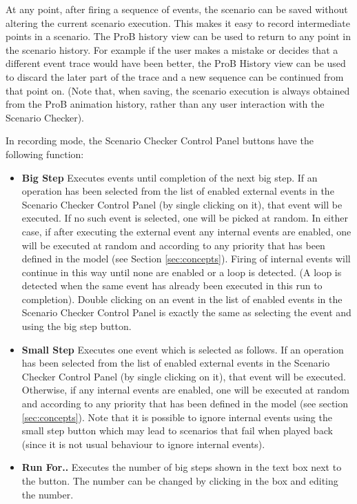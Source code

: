 At any point, after firing a sequence of events, the scenario can be saved without altering the current scenario execution. 
This makes it easy to record intermediate points in a scenario.
The ProB history view can be used to return to any point in the scenario history.
For example if the user makes a mistake or decides that a different event trace would have been better, the ProB History view can be used to discard the later part of the trace and a new sequence can be continued from that point on.
(Note that, when saving, the scenario execution is always obtained from the ProB animation history, rather than any user interaction with the Scenario Checker).

In recording mode, the Scenario Checker Control Panel buttons have the following function:
\begin{itemize}
	\item \textbf{Big Step}  Executes events until completion of the next big step. If an operation has been selected from the list of enabled external events in the Scenario Checker Control Panel (by single clicking on it), that event will be executed. If no such event is selected, one will be picked at random. In either case, if after executing the external event any internal events are enabled, one will be executed at random and according to any priority that has been defined in the model (see Section \ref{sec:concepts}). Firing of internal events will continue in this way until none are enabled or a loop is detected. (A loop is detected when the same event has already been executed in this run to completion). Double clicking on an event in the list of enabled events in the Scenario Checker Control Panel is exactly the same as selecting the event and using the big step button.
	\item \textbf{Small Step}  Executes one event which is selected as follows. If an operation has been selected from the list of enabled external events in the Scenario Checker Control Panel (by single clicking on it), that event will be executed. Otherwise, if any internal events are enabled, one will be executed at random and according to any priority that has been defined in the model (see section \ref{sec:concepts}). Note that it is possible to ignore internal events using the small step button which may lead to scenarios that fail when played back (since it is not usual behaviour to ignore internal events).
	\item \textbf{Run For..}  Executes the number of big steps shown in the text box next to the button. The number can be changed by clicking in the box and editing the number.

\end{itemize}
